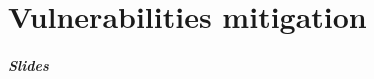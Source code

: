 \part{Vulnerabilities mitigation}

\begin{frame}
	\partpage
\end{frame}

\begin{frame}
	\frametitle{Slides}
\end{frame}
